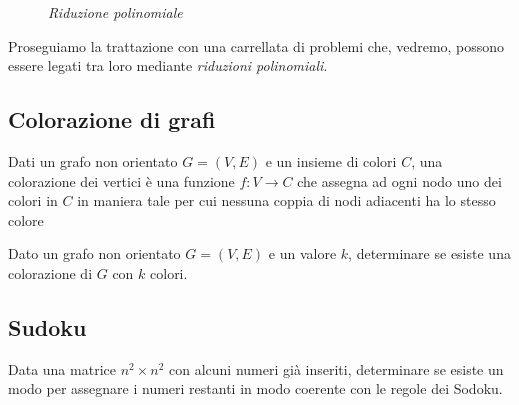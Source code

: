 \begin{figure}[h!]
\centering
{}
\caption{\emph{Riduzione polinomiale}}
\end{figure}

\noindent
Proseguiamo la trattazione con una carrellata di problemi che, vedremo,
possono essere legati tra loro mediante \emph{riduzioni polinomiali}.

\subsection{Colorazione di grafi}
\begin{definition}
    Dati un grafo non orientato $G=(V,E)$ e un insieme di colori $C$, una
    colorazione dei vertici è una funzione $f:V\to C$ che assegna ad ogni nodo
    uno dei colori in $C$ in maniera tale per cui nessuna coppia di nodi adiacenti
    ha lo stesso colore
\end{definition}
\begin{problem}
    Dato un grafo non orientato $G=(V,E)$ e un valore $k$, determinare se
    esiste una colorazione di $G$ con $k$ colori.
\end{problem}

\subsection{Sudoku}
\begin{problem}
    Data una matrice $n^2\times n^2$ con alcuni numeri già inseriti, determinare
    se esiste un modo per assegnare i numeri restanti in modo coerente con le
    regole dei Sodoku.
\end{problem}

